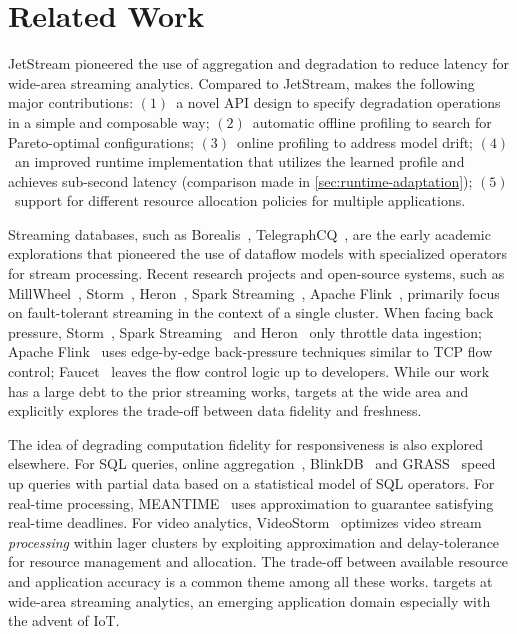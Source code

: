 \section{Related Work}
\label{sec:related-work}

 JetStream pioneered the use of aggregation and degradation to
reduce latency for wide-area streaming analytics. Compared to JetStream,
\sysname{} makes the following major contributions: $(1)$~a novel API design to
specify degradation operations in a simple and composable way; $(2)$~automatic
offline profiling to search for Pareto-optimal configurations; $(3)$~online
profiling to address model drift; $(4)$~an improved runtime implementation that
utilizes the learned profile and achieves sub-second latency (comparison made in
\autoref{sec:runtime-adaptation}); $(5)$~support for different resource
allocation policies for multiple applications.

 Streaming databases, such as
Borealis~\cite{abadi2005design},
TelegraphCQ~\cite{chandrasekaran2003telegraphcq}, are the early academic
explorations that pioneered the use of dataflow models with specialized
operators for stream processing. Recent research projects and open-source
systems, such as MillWheel~\cite{akidau2013millwheel},
Storm~\cite{toshniwal2014storm}, Heron~\cite{sanjeev2015twitter}, Spark
Streaming~\cite{zaharia2013discretized}, Apache Flink~\cite{carbone2015apache},
primarily focus on fault-tolerant streaming in the context of a single
cluster. When facing back pressure, Storm~\cite{toshniwal2014storm}, Spark
Streaming~\cite{zaharia2013discretized} and Heron~\cite{sanjeev2015twitter} only
throttle data ingestion; Apache Flink~\cite{carbone2015apache} uses edge-by-edge
back-pressure techniques similar to TCP flow control;
Faucet~\cite{lattuada2016faucet} leaves the flow control logic up to developers.
While our work has a large debt to the prior streaming works, \sysname{} targets
at the wide area and explicitly explores the trade-off between data fidelity and
freshness.

 The idea of degrading computation fidelity for
responsiveness is also explored elsewhere. For SQL queries, online
aggregation~\cite{hellerstein1997online}, BlinkDB~\cite{agarwal2013blinkdb} and
GRASS~\cite{ananthanarayanan2014grass} speed up queries with partial data based
on a statistical model of SQL operators. For real-time processing,
MEANTIME~\cite{farrell2016meantime} uses approximation to guarantee satisfying
real-time deadlines. For video analytics, VideoStorm~\cite{zhang2017live}
optimizes video stream \textit{processing} within lager clusters by exploiting
approximation and delay-tolerance for resource management and allocation. The
trade-off between available resource and application accuracy is a common theme
among all these works. \sysname{} targets at wide-area streaming analytics, an
emerging application domain especially with the advent of IoT\@.

